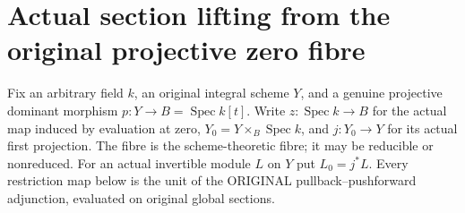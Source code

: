 \section{Actual section lifting from the original projective zero fibre}

Fix an arbitrary field $k$, an original integral scheme $Y$, and a genuine
projective dominant morphism $p:Y\to B=\operatorname{Spec}k[t]$. Write
$z:\operatorname{Spec}k\to B$ for the actual map induced by evaluation at
zero, $Y_0=Y\times_B\operatorname{Spec}k$, and $j:Y_0\to Y$ for its actual
first projection. The fibre is the scheme-theoretic fibre; it may be
reducible or nonreduced. For an actual invertible module $L$ on $Y$ put
$L_0=j^*L$. Every restriction map below is the unit of the ORIGINAL
pullback--pushforward adjunction, evaluated on original global sections.

